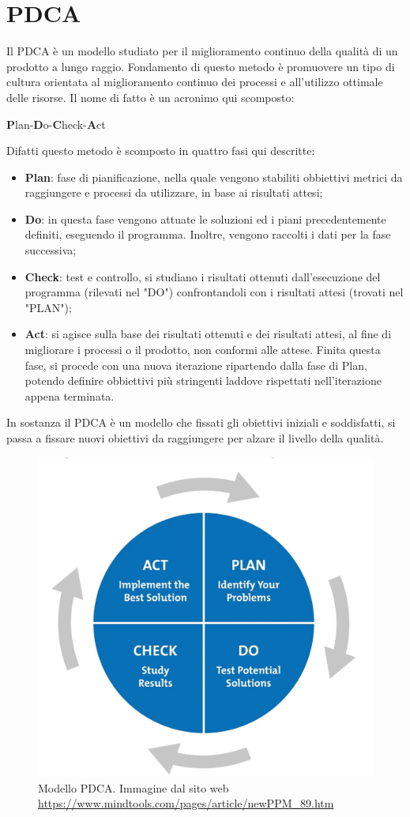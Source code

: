 \section{PDCA}\label{PDCASection}
Il PDCA è un modello studiato per il miglioramento continuo della qualità di un prodotto a lungo raggio. Fondamento di questo metodo è promuovere un tipo di cultura orientata al miglioramento continuo dei processi e all'utilizzo ottimale delle risorse. Il nome di fatto è un acronimo qui scomposto:
\begin{center}
	\item \textbf{P}lan-\textbf{D}o-\textbf{C}heck-\textbf{A}ct
\end{center}
Difatti questo metodo è scomposto in quattro fasi qui descritte:
\begin{itemize}
	\item \textbf{Plan}: fase di pianificazione, nella quale vengono stabiliti obbiettivi metrici da raggiungere e processi da utilizzare, in base ai risultati attesi;
	\item \textbf{Do}: in questa fase vengono attuate le soluzioni ed i piani precedentemente definiti, eseguendo il programma. Inoltre, vengono raccolti i dati per la fase successiva;
	\item \textbf{Check}: test e controllo, si studiano i risultati ottenuti dall'esecuzione del programma (rilevati nel "DO") confrontandoli con i risultati attesi (trovati nel "PLAN"); 
	\item \textbf{Act}: si agisce sulla base dei risultati ottenuti e dei risultati attesi, al fine di migliorare i processi o il prodotto, non conformi alle attese. Finita questa fase, si procede con una nuova iterazione ripartendo dalla fase di Plan, potendo definire obbiettivi più stringenti laddove rispettati nell'iterazione appena terminata.
\end{itemize}
In sostanza il PDCA è un modello che fissati gli obiettivi iniziali e soddisfatti, si passa a fissare nuovi obiettivi da raggiungere per alzare il livello della qualità.

\begin{figure}[H]
\centering
	\includegraphics[width=0.4\linewidth]{./images/pdca.jpg}
	\caption{Modello PDCA. Immagine dal sito web \url{https://www.mindtools.com/pages/article/newPPM_89.htm}}
	\label{pdca}
\end{figure} 

 